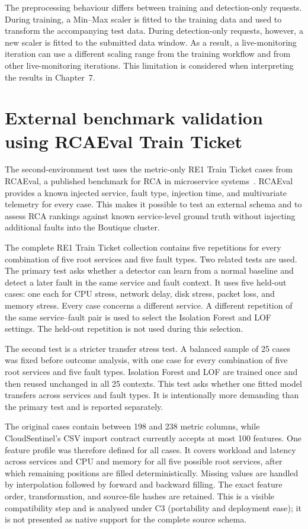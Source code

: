 The preprocessing behaviour differs between training and detection-only requests. During training, a Min--Max scaler is fitted to the training data and used to transform the accompanying test data. During detection-only requests, however, a new scaler is fitted to the submitted data window. As a result, a live-monitoring iteration can use a different scaling range from the training workflow and from other live-monitoring iterations. This limitation is considered when interpreting the results in Chapter~7.

\section{External benchmark validation using RCAEval Train Ticket}
\label{sec:external_benchmark_case}

The second-environment test uses the metric-only RE1 Train Ticket cases from RCAEval, a published benchmark for RCA in microservice systems~\cite{pham2025rcaeval}. RCAEval provides a known injected service, fault type, injection time, and multivariate telemetry for every case. This makes it possible to test an external schema and to assess RCA rankings against known service-level ground truth without injecting additional faults into the Boutique cluster.

The complete RE1 Train Ticket collection contains five repetitions for every combination of five root services and five fault types. Two related tests are used. The primary test asks whether a detector can learn from a normal baseline and detect a later fault in the same service and fault context. It uses five held-out cases: one each for CPU stress, network delay, disk stress, packet loss, and memory stress. Every case concerns a different service. A different repetition of the same service--fault pair is used to select the Isolation Forest and LOF settings. The held-out repetition is not used during this selection.

The second test is a stricter transfer stress test. A balanced sample of 25 cases was fixed before outcome analysis, with one case for every combination of five root services and five fault types. Isolation Forest and LOF are trained once and then reused unchanged in all 25 contexts. This test asks whether one fitted model transfers across services and fault types. It is intentionally more demanding than the primary test and is reported separately.

The original cases contain between 198 and 238 metric columns, while CloudSentinel's CSV import contract currently accepts at most 100 features. One feature profile was therefore defined for all cases. It covers workload and latency across services and CPU and memory for all five possible root services, after which remaining positions are filled deterministically. Missing values are handled by interpolation followed by forward and backward filling. The exact feature order, transformation, and source-file hashes are retained. This is a visible compatibility step and is analysed under C3 (portability and deployment ease); it is not presented as native support for the complete source schema.

